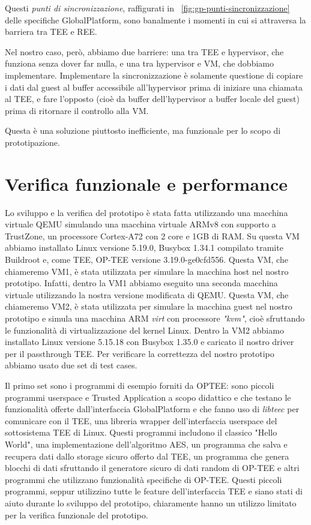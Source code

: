 \documentclass[12pt,italian]{report}
\begin{document}
Questi \textit{punti di sincronizzazione}, raffigurati in
\figurename~\ref{fig:gp-punti-sincronizzazione} delle specifiche GlobalPlatform,
sono banalmente i momenti in cui si attraversa la barriera tra TEE e REE.

Nel nostro caso, però, abbiamo due barriere: una tra TEE e hypervisor,
che funziona
senza dover far nulla, e una tra hypervisor e VM, che dobbiamo implementare.
Implementare la sincronizzazione è solamente questione di copiare i dati dal
guest al buffer accessibile all'hypervisor prima di iniziare una chiamata
al TEE, e fare l'opposto (cioè da buffer dell'hypervisor a buffer locale
del guest) prima di ritornare il controllo alla VM.

Questa è una soluzione piuttosto inefficiente, ma funzionale per lo scopo di
prototipazione.

\section{Verifica funzionale e performance}
\label{sec:verifica-funzionale-e-performance}
Lo sviluppo e la verifica del prototipo è stata fatta utilizzando una macchina
virtuale QEMU simulando una macchina virtuale ARMv8 con supporto a TrustZone,
un processore Cortex-A72 con 2 core e 1GB di RAM.
Su questa VM abbiamo installato Linux versione 5.19.0,
Busybox 1.34.1 compilato tramite Buildroot e, come TEE, OP-TEE versione
3.19.0-ge0cfd556.
Questa VM, che chiameremo VM1, è stata utilizzata per simulare la macchina
host nel nostro prototipo. Infatti, dentro la VM1 abbiamo eseguito una
seconda macchina virtuale utilizzando la nostra versione modificata di QEMU.
Questa VM, che chiameremo VM2, è stata utilizzata per simulare la macchina
guest nel nostro prototipo e simula una macchina ARM \textit{virt} con
processore \textit{"kvm"}, cioè sfruttando le funzionalità di virtualizzazione
del kernel Linux.
Dentro la VM2 abbiamo installato Linux versione 5.15.18 con Busybox 1.35.0
e caricato il nostro driver per il passthrough TEE.
Per verificare la correttezza del nostro prototipo abbiamo usato due set di
test cases.

Il primo set sono i programmi di esempio forniti da OPTEE: sono piccoli
programmi userspace e Trusted Application a scopo didattico e che testano le
funzionalità offerte dall'interfaccia GlobalPlatform e che fanno uso di
\textit{libteec} per comunicare con il TEE, una libreria wrapper
dell'interfaccia userspace del sottosistema TEE di Linux.
Questi programmi includono il classico "Hello World", una implementazione
dell'algoritmo AES, un programma che salva e recupera dati dallo storage
sicuro offerto dal TEE, un programma che genera blocchi di dati
sfruttando il generatore sicuro di dati random di OP-TEE e altri
programmi che utilizzano funzionalità specifiche di OP-TEE.
Questi piccoli programmi, seppur utilizzino tutte le feature dell'interfaccia
TEE e siano stati di aiuto durante lo sviluppo del prototipo, chiaramente
hanno un utilizzo limitato per la verifica funzionale del prototipo.
\end{document}
